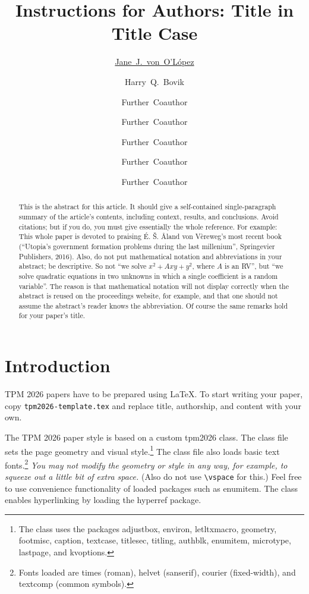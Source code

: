 \documentclass{tpm2026} %
\title{Instructions for Authors: Title in Title Case}
\author[1]{\href{mailto:<jj@example.edu>?Subject=Your TPM 2026 paper}{Jane~J.~von~O'L\'opez}{}}
\author[1]{Harry~Q.~Bovik}
\author[1,2]{Further~Coauthor}
\author[3]{Further~Coauthor}
\author[1]{Further~Coauthor}
\author[3]{Further~Coauthor}
\author[3,1]{Further~Coauthor}
\affil[1]{%
    Computer Science Dept.\\
    Cranberry University\\
    Pittsburgh, Pennsylvania, USA
}
\affil[2]{%
    Second Affiliation\\
    Address\\
    …
}
\affil[3]{%
    Another Affiliation\\
    Address\\
    …
  }
\begin{document}
\maketitle

\begin{abstract}
  This is the abstract for this article.
  It should give a self-contained single-paragraph summary of the article's contents, including context, results, and conclusions.
  Avoid citations; but if you do, you must give essentially the whole reference.
  For example: This whole paper is devoted to praising É. Š. Åland von Vèreweg's most recent book (“Utopia's government formation problems during the last millenium”, Springevier Publishers, 2016).
  Also, do not put mathematical notation and abbreviations in your abstract; be descriptive.
  So not “we solve \(x^2+A xy+y^2\), where \(A\) is an RV”, but “we solve quadratic equations in two unknowns in which a single coefficient is a random variable”.
  The reason is that mathematical notation will not display correctly when the abstract is reused on the proceedings website, for example, and that one should not assume the abstract's reader knows the abbreviation.
  Of course the same remarks hold for your paper's title.
\end{abstract}

\section{Introduction}\label{sec:intro}
TPM 2026 papers have to be prepared using \LaTeX.
To start writing your paper, copy \texttt{tpm2026-template.tex} and replace title, authorship, and content with your own.

The TPM 2026 paper style is based on a custom \textsf{tpm2026} class.
The class file sets the page geometry and visual style.\footnote{%
    The class uses the packages \textsf{adjustbox}, \textsf{environ}, \textsf{letltxmacro}, \textsf{geometry}, \textsf{footmisc}, \textsf{caption}, \textsf{textcase}, \textsf{titlesec}, \textsf{titling}, \textsf{authblk}, \textsf{enumitem}, \textsf{microtype}, \textsf{lastpage}, and \textsf{kvoptions}.
}
The class file also loads basic text fonts.\footnote{%
    Fonts loaded are \textsf{times} (roman), \textsf{helvet} (sanserif), \textsf{courier} (fixed-width), and \textsf{textcomp} (common symbols).
}
\emph{You may not modify the geometry or style in any way, for example, to squeeze out a little bit of extra space.}
(Also do not use \verb|\vspace| for this.)
Feel free to use convenience functionality of loaded packages such as \textsf{enumitem}.
The class enables hyperlinking by loading the \textsf{hyperref} package.
\end{document}
